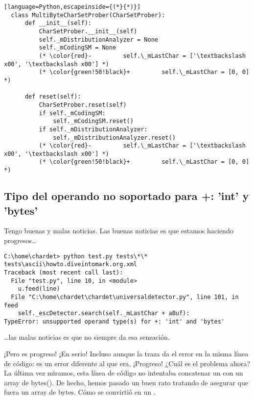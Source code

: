 \begin{lstlisting}[language=Python,escapeinside={(*}{*)}]
  class MultiByteCharSetProber(CharSetProber):
      def __init__(self):
          CharSetProber.__init__(self)
          self._mDistributionAnalyzer = None
          self._mCodingSM = None
          (* \color{red}-         self.\_mLastChar = ['\textbackslash x00', '\textbackslash x00'] *)
          (* \color{green!50!black}+         self.\_mLastChar = [0, 0] *)

      def reset(self):
          CharSetProber.reset(self)
          if self._mCodingSM:
              self._mCodingSM.reset()
          if self._mDistributionAnalyzer:
              self._mDistributionAnalyzer.reset()
          (* \color{red}-         self.\_mLastChar = ['\textbackslash x00', '\textbackslash x00'] *)
          (* \color{green!50!black}+         self.\_mLastChar = [0, 0] *)
\end{lstlisting}

\subsection{Tipo del operando no soportado para +: 'int' y 'bytes'}

Tengo buenas y malas noticias. Las buenas noticias es que estamos haciendo progresos\ldots


\noindent\begin{minipage}{\textwidth}
\begin{lstlisting}[breaklines=true]
C:\home\chardet> python test.py tests\*\*
tests\ascii\howto.diveintomark.org.xml
Traceback (most recent call last):
  File "test.py", line 10, in <module>
    u.feed(line)
  File "C:\home\chardet\chardet\universaldetector.py", line 101, in feed
    self._escDetector.search(self._mLastChar + aBuf):
TypeError: unsupported operand type(s) for +: 'int' and 'bytes'
\end{lstlisting}
\end{minipage}

\ldots las malas noticias es que no siempre da esa sensación.

¡Pero es progreso! ¡En serio! Incluso aunque la traza da el error en la misma línea de código: es un error diferente al que era. ¡Progreso! ¿Cuál es el problema ahora? La última vez miramos, esta línea de código no intentaba concatenar un  con un array de bytes(). De hecho, hemos pasado un buen rato tratando de asegurar que  fuera un array de bytes. Cómo se convirtió en un .

